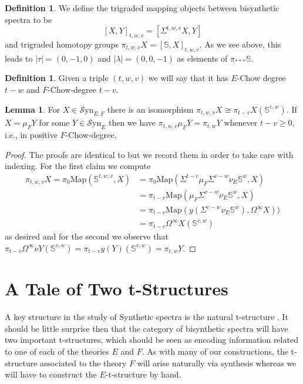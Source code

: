 \documentclass[10pt]{amsart}
\theoremstyle{definition}
\numberwithin{figure}{section}
\numberwithin{equation}{section}
\newtheorem{lemma}[figure]{Lemma}
\newtheorem{definition}[figure]{Definition}
\theoremstyle{cited}
\newcommand{\bS}{\mathbb{S}}
\newcommand{\Map}{\mathrm{Map}}
\newcommand{\Syn}{\mathcal{S}\mathrm{yn}}
\begin{document}
\begin{definition}
  We define the trigraded mapping objects between bisynthetic spectra to be
  \[
  [X,Y]_{t,w,v}=[\Sigma^{t,w,v}X, Y]
  \]
  and trigraded homotopy groups $\pi_{t,w,v}X=[\bS, X]_{t,w,v}$. As we see above, this leads to $|\tau|=(0,-1,0)$ and $|\lambda|=(0,0,-1)$ as elements of $\pi_{***}\bS$.
\end{definition}

\begin{definition}
  Given a triple $(t,w,v)$ we will say that it has $E$-Chow degree $t-w$ and $F$-Chow-degree $t-v$.
\end{definition}

\begin{lemma}\label{homotopyfchow}
  For $X\in \Syn_{E,F}$ there is an isomorphism $\pi_{t,w,v} X \cong \pi_{t-v}X(\bS^{v,w})$. If $X=\mu_F Y$ for some $Y\in \Syn_{E}$ then we have $\pi_{t,w,v}\mu_F Y = \pi_{t,w} Y$ whenever $t-v\geq 0$, i.e., in positive $F$-Chow-degree.
\end{lemma}

\begin{proof}
  The proofs are identical to \cite[Lem. 4.11, Cor. 4.12]{Pst22} but we record them in order to take care with indexing. For the first claim we compute
  \begin{align*}
    \pi_{t,w,v}X = \pi_0\Map(\bS^{t,w,v}, X) &= \pi_{0}\Map(\Sigma^{t-v}\mu_F\Sigma^{v-w}\nu_E\bS^w, X)\\
    &= \pi_{t-v}\Map(\mu_F\Sigma^{v-w}\nu_E\bS^w, X)\\
    &= \pi_{t-v}\Map(y(\Sigma^{v-w}\nu_E\bS^w), \Omega^\infty X))\\
    &= \pi_{t-v}\Omega^\infty X(\bS^{v,w})
  \end{align*}
  as desired and for the second we observe that $\pi_{t-v}\Omega^\infty\nu Y(\bS^{v,w})=\pi_{t-v}y(Y)(\bS^{v,w})=\pi_{t,w}Y$.
\end{proof}

\section{A Tale of Two t-Structures}

A key structure in the study of Synthetic spectra is the natural t-structure \cite[Sec. 4.2]{Pst22}. It should be little surprise then that the category of bisynthetic spectra will have two important t-structures, which should be seen as encoding information related to one of each of the theories $E$ and $F$. As with many of our constructions, the t-structure associated to the theory $F$ will arise naturally via synthesis whereas we will have to construct the $E$-t-structure by hand.
\end{document}
